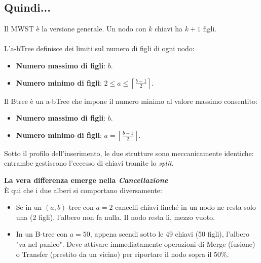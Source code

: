\documentclass[a4paper,12pt]{article}
\begin{document}
\subsection{Quindi...}
Il MWST è la versione generale. Un nodo con $k$ chiavi ha $k+1$ figli.\\\\
L'a-bTree definisce dei limiti sul numero di figli di ogni nodo: 
\begin{itemize}
    \item \textbf{Numero massimo di figli}: $b$.
    \item \textbf{Numero minimo di figli}: $2\le a \le\left\lceil \frac{b-1}{2} \right\rceil$. 
\end{itemize}
\medskip
Il Btree è un a-bTree che impone il numero minimo al valore massimo consentito:
\begin{itemize}
    \item \textbf{Numero massimo di figli}: $b$.
    \item \textbf{Numero minimo di figli}: $a=\left\lceil \frac{b-1}{2} \right\rceil$. 
\end{itemize}
\medskip\medskip
Sotto il profilo dell'inserimento, le due strutture sono meccanicamente identiche: entrambe gestiscono l'eccesso di chiavi tramite lo \textit{split}.

\textbf{La vera differenza emerge nella \textit{Cancellazione}}\\
È qui che i due alberi si comportano diversamente:

\begin{itemize}
    \item Se in un $(a, b)$-tree con $a=2$ cancelli chiavi finché in un nodo ne resta solo una (2 figli), l'albero non fa nulla. Il nodo resta lì, mezzo vuoto.
    \item In un B-tree con $a=50$, appena scendi sotto le 49 chiavi (50 figli), l'albero "va nel panico".
          Deve attivare immediatamente operazioni di Merge (fusione) o Transfer (prestito da un vicino) per riportare il nodo sopra il 50\%.
\end{itemize}
\end{document}
